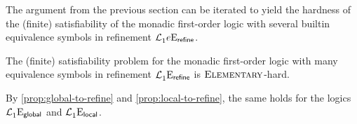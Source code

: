 The argument from the previous section can be iterated to yield the hardness of
the (finite) satisfiability of the monadic first-order logic with several
builtin equivalence symbols in refinement $\mathcal{L}^{{}}_{1}{e}\mathrm{E}_{\mathsf{refine}}$.

\begin{proposition}
The (finite) satisfiability problem for the monadic first-order logic with many
equivalence symbols in refinement $\mathcal{L}^{{}}_{1}{{}}\mathrm{E}_{\mathsf{refine}}$ is
$\text{\normalfont{\scshape Elementary}}$-hard.

By \cref{prop:global-to-refine} and \cref{prop:local-to-refine}, the same
holds for the logics $\mathcal{L}^{{}}_{1}{{}}\mathrm{E}_{\mathsf{global}}$ and
$\mathcal{L}^{{}}_{1}{{}}\mathrm{E}_{\mathsf{local}}$.
\end{proposition}